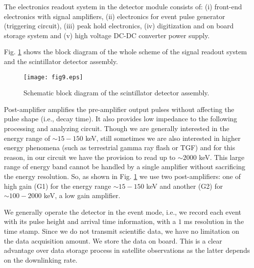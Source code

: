 The electronics readout system in the detector module consists of: (i) front-end
electronics with signal amplifiers, (ii) electronics for event pulse
generator (triggering circuit), (iii) peak hold electronics, (iv) digitization
and on board storage system and (v) high voltage DC-DC converter power supply.

Fig. \ref{fig:scint} shows the block diagram of the whole scheme of the
signal readout system and the scintillator detector assembly.

\begin{figure}[h]
  \centering
  \texttt{[image: fig9.eps]}
  \caption{Schematic block diagram of the scintillator detector assembly.}
   \label{fig:scint}
\end{figure}

Post-amplifier amplifies the pre-amplifier output pulses without affecting the
pulse shape (i.e., decay time). It also provides low impedance to the following
processing and analyzing circuit. Though we are generally interested in the
energy range of $\sim 15-150$ keV, still sometimes we are also interested in
higher energy phenomena (such as terrestrial gamma ray flash or TGF) and for this reason, in our circuit we have
the provision to read up to $\sim 2000$ keV. This large range of energy band
cannot be handled by a single amplifier without sacrificing the energy resolution. 
So, as shown in Fig. \ref{fig:scint} we
use two post-amplifiers: one of high gain (G1) for the energy range $\sim 15-150$
keV and another (G2) for $\sim 100-2000$ keV, a low gain amplifier. 

We generally operate the detector in the event mode, i.e., we record each event
with its pulse height and arrival time information, with a $1$ ms resolution in
the time stamp. Since we do not transmit scientific data, we have no limitation 
on the data acquisition amount. We store the data on board. This is a clear advantage over data storage 
process in satellite observations as the latter depends on the downlinking rate. 

